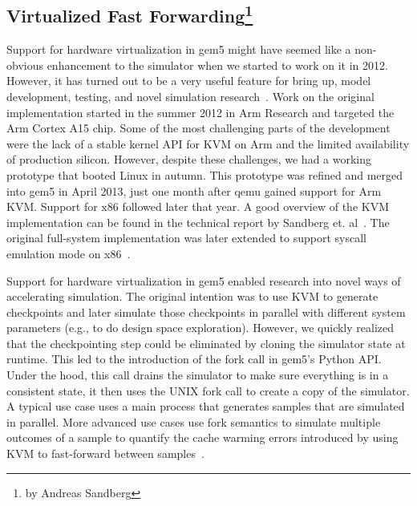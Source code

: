 \subsection[Virtualized Fast Forwarding]{Virtualized Fast Forwarding\footnote{by Andreas Sandberg}}

Support for hardware virtualization in gem5 might have seemed like a non-obvious enhancement to the simulator when we started to work on it in 2012.
However, it has turned out to be a very useful feature for bring up, model development, testing, and novel simulation research~\cite{full-speed-ahead, NikolerisSHC16, NikolerisEHC19}.
Work on the original implementation started in the summer 2012 in Arm Research and targeted the Arm Cortex A15 chip. Some of the most challenging parts of the development were the lack of a stable kernel API for KVM on Arm and the limited availability of production silicon.
However, despite these challenges, we had a working prototype that booted Linux in autumn.
This prototype was refined and merged into gem5 in April 2013, just one month after qemu gained support for Arm KVM.
Support for x86 followed later that year.
A good overview of the KVM implementation can be found in the technical report by Sandberg et. al~\cite{full-speed-ahead}.
The original full-system implementation was later extended to support syscall emulation mode on x86~\cite{DutuSlice2015-kvm}.

Support for hardware virtualization in gem5 enabled research into novel ways of accelerating simulation.
The original intention was to use KVM to generate checkpoints and later simulate those checkpoints in parallel with different system parameters (e.g., to do design space exploration).
However, we quickly realized that the checkpointing step could be eliminated by cloning the simulator state at runtime.
This led to the introduction of the fork call in gem5's Python API.
Under the hood, this call drains the simulator to make sure everything is in a consistent state, it then uses the UNIX fork call to create a copy of the simulator.
A typical use case uses a main process that generates samples that are simulated in parallel.
More advanced use cases use fork semantics to simulate multiple outcomes of a sample to quantify the cache warming errors introduced by using KVM to fast-forward between samples~\cite{full-speed-ahead}.
